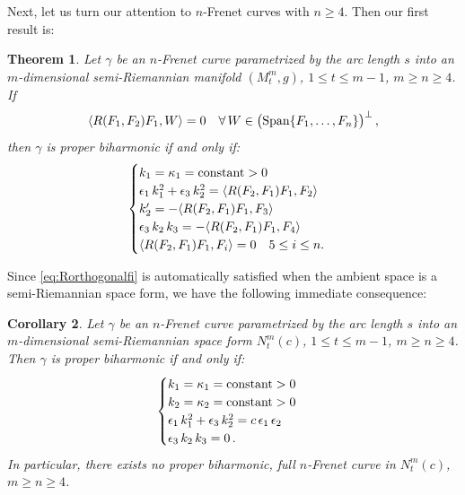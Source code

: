 \documentclass[11pt]{amsart}
\theoremstyle{plain}
\newtheorem{theorem}                {Theorem}      [section]
\newtheorem{corollary}    [theorem]  {Corollary}
\theoremstyle{definition}
\numberwithin{equation}{section}
\begin{document}
Next, let us turn our attention to $n$-Frenet curves with $n \geq 4$. Then our first result is:

\begin{theorem}\label{biharmonic-n-Frenet-curve}
Let $\gamma$ be an $n$-Frenet curve parametrized by the arc length $s$ into an $m$-dimensional semi-Riemannian manifold $(M_t^m, g)$, $1 \leq t \leq m-1$, $m \geq n \geq 4$. If
\begin{equation}\label{eq:Rorthogonalfi}
\langle R(F_1,F_2)F_1,W \rangle =0 \quad \forall\, W \in \big({\rm Span}\{F_1,\ldots,F_n\}\big)^\perp \,,
\end{equation}
then $\gamma$ is proper biharmonic if and only if:
\begin{equation}\label{eq-biharm-n-Frenet}
\begin{cases}
k_1 =\kappa_1= {\rm constant} > 0\\
\epsilon_1 \, k_1^2 + \epsilon_3 \, k_2^2 = \langle R(F_2, F_1) F_1, F_2 \rangle\\
k_2' = - \langle R(F_2, F_1) F_1 , F_3 \rangle\\
\epsilon_3 \, k_2 \, k_3 = - \langle R(F_2, F_1) F_1 , F_4 \rangle\\
\langle R(F_2, F_1) F_1 , F_i \rangle = 0 \quad 5 \leq i \leq n.
\end{cases} 
\end{equation}
\end{theorem}
Since \eqref{eq:Rorthogonalfi} is automatically satisfied when the ambient space is a semi-Riemannian space form, we have the following immediate consequence:
\begin{corollary}\label{Cor-biharmonic-n-Frenet-space-forms}
Let $\gamma$ be an $n$-Frenet curve parametrized by the arc length $s$ into an $m$-dimensional semi-Riemannian space form $N^m_t(c)$, $1 \leq t \leq m-1$, $m\geq n \geq 4$. Then $\gamma$ is proper biharmonic if and only if:
\begin{equation}\label{eq-biharm-n-Frenet-space-forms}
\begin{cases}
k_1 =\kappa_1= {\rm constant} >0\\
k_2 =\kappa_2= {\rm constant} >0\\
\epsilon_1 \, k_1^2 + \epsilon_3 \, k_2^2 = c \,\epsilon_1\,\epsilon_2\,\\
\epsilon_3 \,k_2 \,k_3=0\,.
\end{cases} 
\end{equation}
In particular, there exists no proper biharmonic, full $n$-Frenet curve in $N^m_t(c)$, $m\geq n \geq 4$.
\end{corollary}
\end{document}
